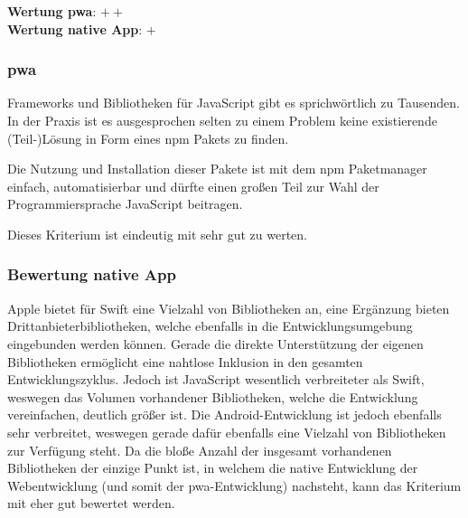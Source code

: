 \textbf{Wertung \ac{pwa}}: $++$\\
\textbf{Wertung native App}: $+$ \\

\subsubsection{\ac{pwa}}
Frameworks und Bibliotheken für JavaScript gibt es sprichwörtlich zu Tausenden. In der Praxis ist es ausgesprochen selten zu einem Problem keine existierende (Teil-)Lösung in Form eines npm Pakets zu finden.

Die Nutzung und Installation dieser Pakete ist mit dem npm Paketmanager einfach, automatisierbar und dürfte einen großen Teil zur Wahl der Programmiersprache JavaScript beitragen.

Dieses Kriterium ist eindeutig mit sehr gut zu werten.

\subsubsection{Bewertung native App}
Apple bietet für Swift eine Vielzahl von Bibliotheken an, eine Ergänzung bieten Drittanbieterbibliotheken, welche ebenfalls in die Entwicklungsumgebung eingebunden werden können. Gerade die direkte Unterstützung der eigenen Bibliotheken ermöglicht eine nahtlose Inklusion in den gesamten Entwicklungszyklus. Jedoch ist JavaScript wesentlich verbreiteter als Swift, weswegen das Volumen vorhandener Bibliotheken, welche die Entwicklung vereinfachen, deutlich größer ist. Die Android-Entwicklung ist jedoch ebenfalls sehr verbreitet, weswegen gerade dafür ebenfalls eine Vielzahl von Bibliotheken zur Verfügung steht. Da die bloße Anzahl der insgesamt vorhandenen Bibliotheken der einzige Punkt ist, in welchem die native Entwicklung der Webentwicklung (und somit der \ac{pwa}-Entwicklung) nachsteht, kann das Kriterium mit eher gut bewertet werden.